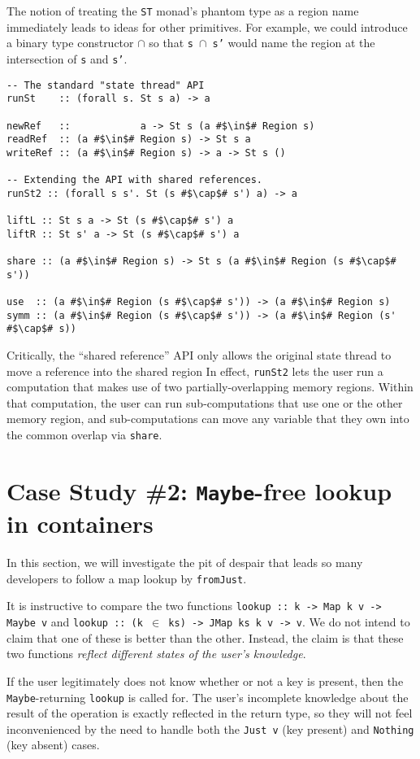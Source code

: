 \documentclass[format=sigplan, review=false, screen=true]{acmart}
\begin{document}
The notion of treating the \texttt{ST} monad's phantom type as a region name immediately leads to ideas for
other primitives. For example, we could introduce a binary type constructor $\cap$ so that \texttt{s $\cap$ s'}
would name the region at the intersection of \texttt{s} and \texttt{s'}. 

\begin{verbatim}
-- The standard "state thread" API
runSt    :: (forall s. St s a) -> a

newRef   ::            a -> St s (a #$\in$# Region s)
readRef  :: (a #$\in$# Region s) -> St s a
writeRef :: (a #$\in$# Region s) -> a -> St s ()

-- Extending the API with shared references.
runSt2 :: (forall s s'. St (s #$\cap$# s') a) -> a

liftL :: St s a -> St (s #$\cap$# s') a
liftR :: St s' a -> St (s #$\cap$# s') a

share :: (a #$\in$# Region s) -> St s (a #$\in$# Region (s #$\cap$# s'))

use  :: (a #$\in$# Region (s #$\cap$# s')) -> (a #$\in$# Region s)
symm :: (a #$\in$# Region (s #$\cap$# s')) -> (a #$\in$# Region (s' #$\cap$# s))
\end{verbatim}
Critically, the ``shared reference'' API only allows the
original state thread to move a reference into the shared region
In effect, \texttt{runSt2} lets the user run a computation that makes use of
two partially-overlapping memory regions. Within that computation, the user
can run sub-computations that use one or the other memory region, and
sub-computations can move any variable that they own into the common overlap
via \texttt{share}.

\section{Case Study \#2: \texttt{Maybe}-free lookup in containers}

In this section, we will investigate the pit of despair that leads so
many developers to follow a map lookup by \texttt{fromJust}.

It is instructive to compare the two functions \texttt{lookup :: k -> Map k v -> Maybe v}
and \texttt{lookup :: (k $\in$ ks) -> JMap ks k v -> v}. We do not intend to claim that
one of these is better than the other. Instead, the claim is that these two functions
\emph{reflect different states of the user's knowledge}.

If the user legitimately does not know whether or not a key is present, then the
\texttt{Maybe}-returning \texttt{lookup} is called for. The user's incomplete knowledge
about the result of the operation is exactly reflected in the return type, so they will
not feel inconvenienced by the need to handle both the \texttt{Just v} (key present)
and \texttt{Nothing} (key absent) cases.
\end{document}
